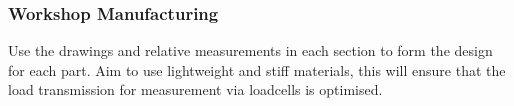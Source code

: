 \subsubsection{Workshop Manufacturing}

Use the drawings and relative measurements in each section to form the design for each part. Aim to use lightweight and stiff materials, this will ensure that the load transmission for measurement via loadcells is optimised.